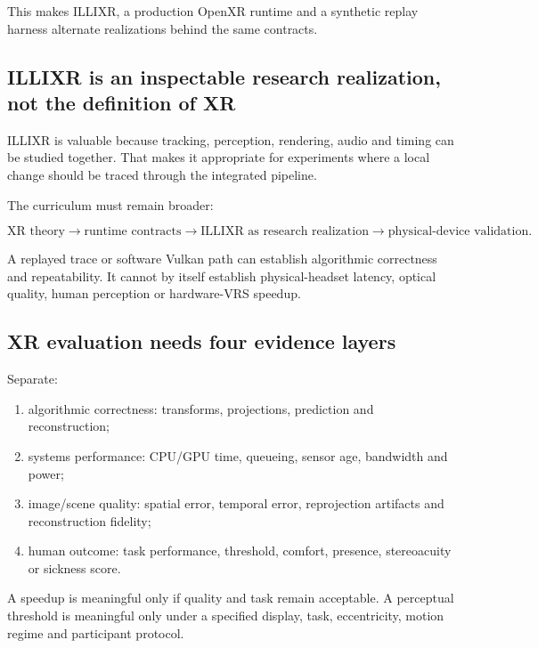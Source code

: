 This makes ILLIXR, a production OpenXR runtime and a synthetic replay harness alternate realizations behind the same contracts.

\subsection{ILLIXR is an inspectable research realization, not the definition of XR}\label{04-visual-computing-ii-ch035-illixr-is-an-inspectable-research-realization-not-the-definition-of-xr}

ILLIXR is valuable because tracking, perception, rendering, audio and timing can be studied together. That makes it appropriate for experiments where a local change should be traced through the integrated pipeline.

The curriculum must remain broader:

\[
\text{XR theory}\rightarrow
\text{runtime contracts}\rightarrow
\text{ILLIXR as research realization}\rightarrow
\text{physical-device validation}.
\]

A replayed trace or software Vulkan path can establish algorithmic correctness and repeatability. It cannot by itself establish physical-headset latency, optical quality, human perception or hardware-VRS speedup.

\subsection{XR evaluation needs four evidence layers}\label{04-visual-computing-ii-ch035-xr-evaluation-needs-four-evidence-layers}

Separate:

\begin{enumerate}
\def\labelenumi{\arabic{enumi}.}
\tightlist
\item
  algorithmic correctness: transforms, projections, prediction and reconstruction;
\item
  systems performance: CPU/GPU time, queueing, sensor age, bandwidth and power;
\item
  image/scene quality: spatial error, temporal error, reprojection artifacts and reconstruction fidelity;
\item
  human outcome: task performance, threshold, comfort, presence, stereoacuity or sickness score.
\end{enumerate}

A speedup is meaningful only if quality and task remain acceptable. A perceptual threshold is meaningful only under a specified display, task, eccentricity, motion regime and participant protocol.

